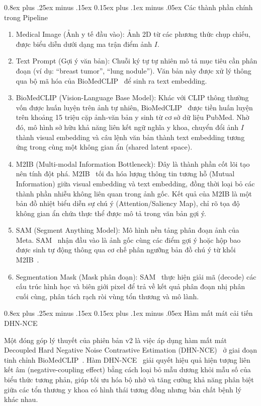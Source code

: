 \documentclass[conference]{IEEEtran}
\makeatletter
\def\subsection{\@startsection{subsection}{2}{\z@}%
  {0.8ex plus .25ex minus .15ex}%
  {0.15ex plus .1ex minus .05ex}%
  {\reset@font\normalsize\itshape}}%
\makeatother
\begin{document}
\subsection{Các thành phần chính trong Pipeline}
\begin{enumerate}
    \item Medical Image (Ảnh y tế đầu vào): Ảnh 2D từ các phương thức chụp chiếu, được biểu diễn dưới dạng ma trận điểm ảnh $I$.
    \item Text Prompt (Gợi ý văn bản): Chuỗi ký tự tự nhiên mô tả mục tiêu cần phân đoạn (ví dụ: ``breast tumor'', ``lung nodule''). Văn bản này được xử lý thông qua bộ mã hóa của BioMedCLIP~\cite{ref3} để sinh ra text embedding.
    \item BioMedCLIP (Vision-Language Base Model): Khác với CLIP thông thường vốn được huấn luyện trên ảnh tự nhiên, BioMedCLIP~\cite{ref3} được tiền huấn luyện trên khoảng 15 triệu cặp ảnh-văn bản y sinh từ cơ sở dữ liệu PubMed. Nhờ đó, mô hình sở hữu khả năng liên kết ngữ nghĩa y khoa, chuyển đổi ảnh $I$ thành visual embedding và câu lệnh văn bản thành text embedding tương ứng trong cùng một không gian ẩn (shared latent space).
    \item M2IB (Multi-modal Information Bottleneck): Đây là thành phần cốt lõi tạo nên tính đột phá. M2IB~\cite{ref7} tối đa hóa lượng thông tin tương hỗ (Mutual Information) giữa visual embedding và text embedding, đồng thời loại bỏ các thành phần nhiễu không liên quan trong ảnh gốc. Kết quả của M2IB là một bản đồ nhiệt biểu diễn sự chú ý (Attention/Saliency Map), chỉ rõ tọa độ không gian ẩn chứa thực thể được mô tả trong văn bản gợi ý.
    \item SAM (Segment Anything Model): Mô hình nền tảng phân đoạn ảnh của Meta. SAM~\cite{ref2,ref4} nhận đầu vào là ảnh gốc cùng các điểm gợi ý hoặc hộp bao được sinh tự động thông qua cơ chế phân ngưỡng bản đồ chú ý từ khối M2IB~\cite{ref7}.
    \item Segmentation Mask (Mask phân đoạn): SAM~\cite{ref2,ref4} thực hiện giải mã (decode) các cấu trúc hình học và biên giới pixel để trả về kết quả phân đoạn nhị phân cuối cùng, phân tách rạch ròi vùng tổn thương và mô lành.
\end{enumerate}

\subsection{Hàm mất mát cải tiến DHN-NCE}

Một đóng góp lý thuyết của phiên bản v2 là việc áp dụng hàm mất mát Decoupled Hard Negative Noise Contrastive Estimation (DHN-NCE)~\cite{ref1} ở giai đoạn tinh chỉnh BioMedCLIP~\cite{ref3}. Hàm DHN-NCE~\cite{ref1} giải quyết hiệu quả hiện tượng liên kết âm (negative-coupling effect) bằng cách loại bỏ mẫu dương khỏi mẫu số của biểu thức tương phản, giúp tối ưu hóa bộ nhớ và tăng cường khả năng phân biệt giữa các tổn thương y khoa có hình thái tương đồng nhưng bản chất bệnh lý khác nhau.
\end{document}
